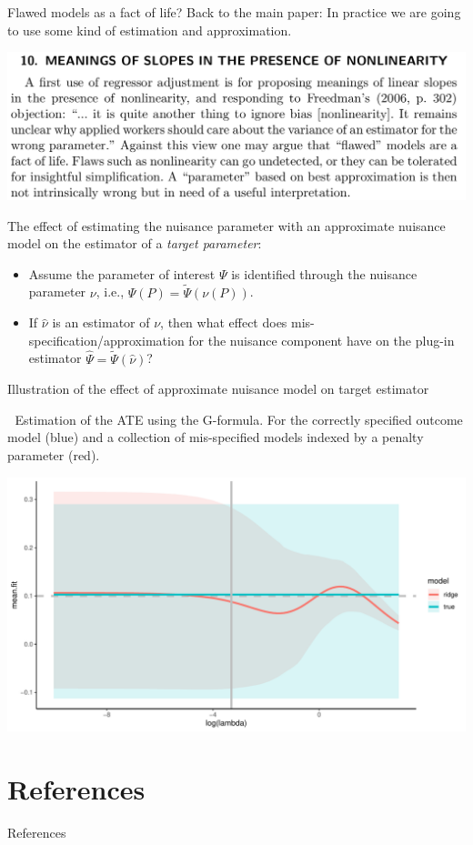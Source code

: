 \documentclass[smaller]{beamer}\usepackage{listings}
\begin{document}
\begin{frame}[label={sec:orge2ded2d}]{Flawed models as a fact of life?}
Back to the main paper: In practice we are going to use some kind of estimation and approximation.
\begin{center}
\includegraphics[width=.9\linewidth]{./quotes/sect10-model-approx.png}
\end{center}

The effect of estimating the nuisance parameter with an approximate nuisance model on the estimator
of a \emph{target parameter}:
\begin{itemize}
\item Assume the parameter of interest \(\Psi\) is identified through the nuisance parameter \(\nu\), i.e.,
\(\Psi(P) = \tilde\Psi(\nu(P))\).
\item If \(\hat \nu\) is an estimator of \(\nu\), then what effect does mis-specification/approximation for
the nuisance component have on the plug-in estimator \(\hat \Psi = \tilde\Psi(\hat \nu)\)?
\end{itemize}
\end{frame}

\begin{frame}[label={sec:orgc8e94cd}]{\normalsize Illustration of the effect of approximate nuisance model on target estimator}
\begin{block}{$\;$}
\small Estimation of the ATE using the G-formula. For the correctly specified outcome model (blue)
and a collection of mis-specified models indexed by a penalty parameter (red).

\begin{center}
\includegraphics[width=.9\linewidth]{./fig-approximate-nuisance.pdf}
\end{center}
\end{block}
\end{frame}

\section{References}
\label{sec:org65b8d50}

\begin{frame}[label={sec:orge483fad}]{References}
\small 
\end{frame}
\end{document}
